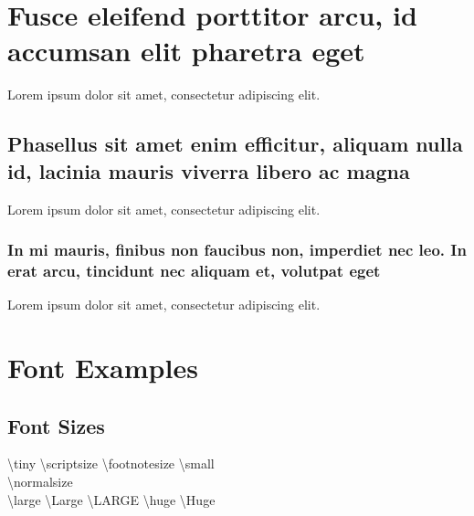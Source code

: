 \documentclass[
	letterpaper, %
	12pt, %
]{CSSullivanBusinessReport}
\begin{document}
\section[Short version of long section title]{Fusce eleifend porttitor arcu, id accumsan elit pharetra eget} %

Lorem ipsum dolor sit amet, consectetur adipiscing elit. 

\subsection[Short version of long subsection title]{Phasellus sit amet enim efficitur, aliquam nulla id, lacinia mauris viverra libero ac magna}

Lorem ipsum dolor sit amet, consectetur adipiscing elit.

\subsubsection{In mi mauris, finibus non faucibus non, imperdiet nec leo. In erat arcu, tincidunt nec aliquam et, volutpat eget}

Lorem ipsum dolor sit amet, consectetur adipiscing elit.


\section{Font Examples}

\subsection{Font Sizes}

{\tiny \textbackslash tiny} {\scriptsize \textbackslash scriptsize} {\footnotesize \textbackslash footnotesize} {\small \textbackslash small}\\
{\normalsize \textbackslash normalsize}\\
{\large \textbackslash large} {\Large \textbackslash Large} {\LARGE \textbackslash LARGE} {\huge \textbackslash huge} {\Huge \textbackslash Huge}
\end{document}

